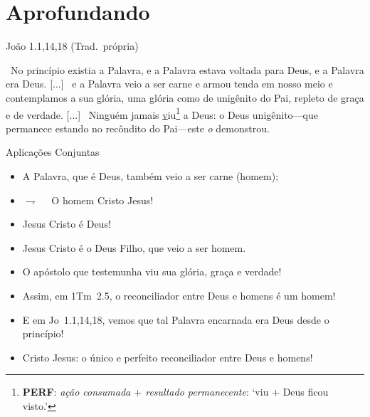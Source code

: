 \documentclass[12pt,aspectratio=169]{beamer}
\newcommand{\ver}[1]{%
    \raisebox{0.50ex}{%
        \scalebox{1.1}{%
            \pmb{\textbf{\textcolor{BSpbg}{#1}}}%
        }%
    }%
}
\newcommand{\QUOTE}[1]{%
    \par\noindent\hspace*{0.1\linewidth}%
    \begin{minipage}{0.8\linewidth}%
        \linespread{1.35}\large{#1}%
    \end{minipage}%
}
\newcommand{\RED}[1]{{\textcolor{TXred}{#1}}}
\newcommand{\YEL}[1]{{\textcolor{TXyel}{#1}}}
\newcommand{\BLU}[1]{{\textcolor{TXblu}{#1}}}
\newcommand{\MAG}[1]{{\textcolor{TXmag}{#1}}}
\newcommand{\BRI}[1]{{\textcolor{BSpbg}{#1}}}   %
\begin{document}
\section{Aprofundando}

    \begin{frame}{João 1.1,14,18 (Trad.~própria)}
        \QUOTE{%
            \normalsize
            \ver{1}~No princípio existia \MAG{a Palavra}, e \MAG{a Palavra}  estava  voltada
            para \BRI{Deus}, e \MAG{a Palavra era Deus}.  [...]  \ver{14}~e  \MAG{a  Palavra
            veio a ser carne} e armou tenda em nosso meio e contemplamos a sua \YEL{glória},
            uma \YEL{glória} como de unigênito do \BRI{Pai}, repleto  de  \YEL{graça}  e  de
            \YEL{verdade}.             [...]             \ver{18}~Ninguém             jamais
            \underline{v}iu\footnote{\textbf{\textsf{PERF}}:  \textit{ação  consumada  $+$  resultado
            permanecente\/}:  `viu  $+$  Deus  ficou  visto.'}  a  \BRI{Deus}:  o  \MAG{Deus
            unigênito}---que  permanece  estando  no  recôndito  do  \BRI{Pai}---este   {\it
            \BRI{o}} demonstrou.
        }
    \end{frame}

    \begin{frame}{Aplicações Conjuntas}
        \begin{itemize}
            \item<1-> A \MAG{Palavra}, que é \BLU{Deus}, também veio a ser \RED{carne} (homem);
            \item<2-> $\rightharpoondown\quad$ O homem \MAG{Cristo Jesus}!
            \item<3-> Jesus Cristo \YEL{é Deus}!$\qquad$\uncover<4->{\BRI{Ele é o meu Deus!}}
            \item<5-> Jesus Cristo \YEL{é} o \BLU{Deus Filho}, que veio a ser \RED{homem}.
            \item<6-> O apóstolo que testemunha viu sua \YEL{glória}, \YEL{graça} e
                \YEL{verdade}! \\[\bigskipamount]
            \item<7-> Assim, em \BRI{1Tm~2.5}, o reconciliador entre \BLU{Deus} e \RED{homens} é
                um \MAG{homem}!
            \item<8-> E em \BRI{Jo~1.1,14,18}, vemos que tal \MAG{Palavra} \RED{encarnada} era
                \BLU{Deus} desde o princípio! \\[\bigskipamount]
            \item<9-> \MAG{Cristo Jesus}: o \YEL{único} e perfeito \MAG{reconciliador} entre
                \BLU{Deus} e \RED{homens}!
        \end{itemize}
    \end{frame}

\end{document}
